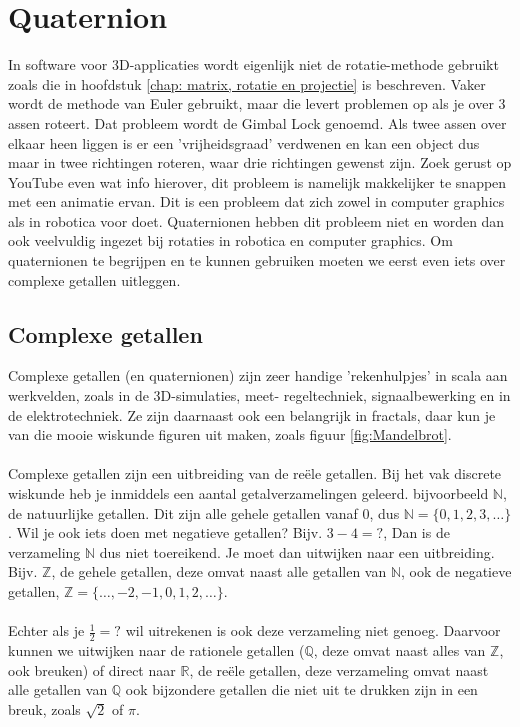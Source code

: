 \chapter{Quaternion}
\label{chap: Quaternion}
In software voor 3D-applicaties wordt eigenlijk niet de rotatie-methode gebruikt zoals die in hoofdstuk \ref{chap: matrix, rotatie en projectie} is beschreven. Vaker wordt de methode van Euler gebruikt, maar die levert problemen op als je over 3 assen roteert. Dat probleem wordt de Gimbal Lock genoemd. Als twee assen over elkaar heen liggen is er een 'vrijheidsgraad' verdwenen en kan een object dus maar in twee richtingen roteren, waar drie richtingen gewenst zijn. Zoek gerust op YouTube even wat info hierover, dit probleem is namelijk makkelijker te snappen met een animatie ervan. Dit is een probleem dat zich zowel in computer graphics als in robotica voor doet. Quaternionen hebben dit probleem niet en worden dan ook veelvuldig ingezet bij rotaties in robotica en computer graphics. Om quaternionen te begrijpen en te kunnen gebruiken moeten we eerst even iets over complexe getallen uitleggen.


\section{Complexe getallen}
Complexe getallen (en quaternionen) zijn zeer handige 'rekenhulpjes' in scala aan werkvelden, zoals in de 3D-simulaties, meet- regeltechniek, signaalbewerking en in de elektrotechniek. Ze zijn daarnaast ook een belangrijk in fractals, daar kun je van die mooie wiskunde figuren uit maken, zoals figuur \ref{fig:Mandelbrot}. \\ \\

Complexe getallen zijn een uitbreiding van de reële getallen. Bij het vak discrete wiskunde heb je inmiddels een aantal getalverzamelingen geleerd. bijvoorbeeld $\mathbb{N}$, de natuurlijke getallen. Dit zijn alle gehele getallen vanaf $0$, dus $\mathbb{N} = \{0, 1, 2, 3, \dots\}$. Wil je ook iets doen met negatieve getallen? Bijv. $3-4=?$, Dan is de verzameling $\mathbb{N}$ dus niet toereikend. Je moet dan uitwijken naar een uitbreiding. Bijv. $\mathbb{Z}$, de gehele getallen, deze omvat naast alle getallen van $\mathbb{N}$, ook de negatieve getallen, $\mathbb{Z} = \{\dots, -2, -1, 0, 1, 2, \dots \}$. \\ \\
Echter als je $\frac{1}{2} = ?$ wil uitrekenen is ook deze verzameling niet genoeg. Daarvoor kunnen we uitwijken naar de rationele getallen ($\mathbb{Q}$, deze omvat naast alles van $\mathbb{Z}$, ook breuken) of direct naar $\mathbb{R}$, de reële getallen, deze verzameling omvat naast alle getallen van $\mathbb{Q}$ ook bijzondere getallen die niet uit te drukken zijn in een breuk, zoals $\sqrt{2}$ of $\pi$. \\


